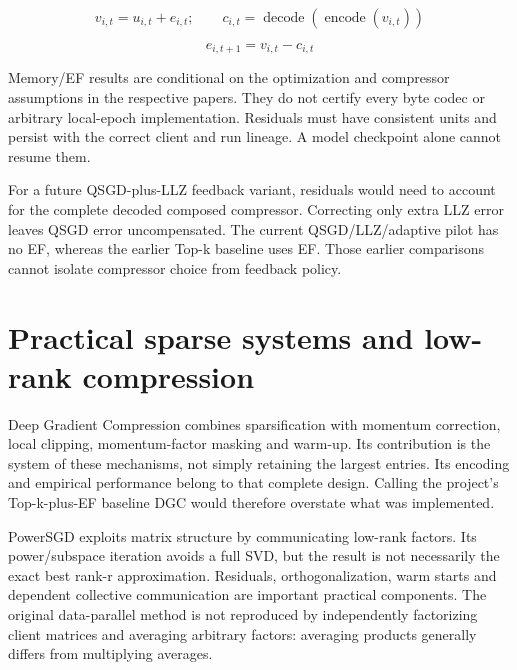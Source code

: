 \documentclass[11pt,a4paper]{article}
\begin{document}
\begin{equation*}v_{i,t}=u_{i,t}+e_{i,t};\qquad c_{i,t}=\operatorname{decode}(\operatorname{encode}(v_{i,t}))\end{equation*}

\begin{equation*}e_{i,t+1}=v_{i,t}-c_{i,t}\end{equation*}

Memory/EF results are conditional on the optimization and compressor assumptions in the respective papers. They do not certify every byte codec or arbitrary local-epoch implementation. Residuals must have consistent units and persist with the correct client and run lineage. A model checkpoint alone cannot resume them. \parencite{stich2018memory,karimireddy2019error}

For a future QSGD-plus-LLZ feedback variant, residuals would need to account for the complete decoded composed compressor. Correcting only extra LLZ error leaves QSGD error uncompensated. The current QSGD/LLZ/adaptive pilot has no EF, whereas the earlier Top-k baseline uses EF. Those earlier comparisons cannot isolate compressor choice from feedback policy.

\section{Practical sparse systems and low-rank compression}

Deep Gradient Compression combines sparsification with momentum correction, local clipping, momentum-factor masking and warm-up. Its contribution is the system of these mechanisms, not simply retaining the largest entries. Its encoding and empirical performance belong to that complete design. Calling the project's Top-k-plus-EF baseline DGC would therefore overstate what was implemented. \parencite{lin2018dgc}

PowerSGD exploits matrix structure by communicating low-rank factors. Its power/subspace iteration avoids a full SVD, but the result is not necessarily the exact best rank-r approximation. Residuals, orthogonalization, warm starts and dependent collective communication are important practical components. The original data-parallel method is not reproduced by independently factorizing client matrices and averaging arbitrary factors: averaging products generally differs from multiplying averages. \parencite{vogels2019powersgd}
\end{document}
